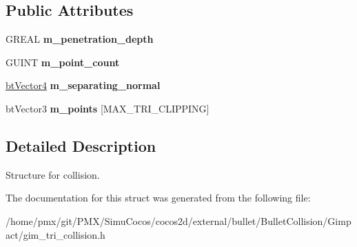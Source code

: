 \subsection*{Public Attributes}
\begin{DoxyCompactItemize}
\item 
\mbox{\label{structGIM__TRIANGLE__CONTACT__DATA_a42268781ae742b60561e8af4297284e1}} 
G\+R\+E\+AL {\bfseries m\+\_\+penetration\+\_\+depth}
\item 
\mbox{\label{structGIM__TRIANGLE__CONTACT__DATA_a60e062bd749b9ce60ad87ae5c577aa49}} 
G\+U\+I\+NT {\bfseries m\+\_\+point\+\_\+count}
\item 
\mbox{\label{structGIM__TRIANGLE__CONTACT__DATA_af060d0dbffcd1be4c3afe488efbd4df5}} 
\hyperlink{classbtVector4}{bt\+Vector4} {\bfseries m\+\_\+separating\+\_\+normal}
\item 
\mbox{\label{structGIM__TRIANGLE__CONTACT__DATA_a45942a990c824d0e61bb6e57aa1ffd10}} 
bt\+Vector3 {\bfseries m\+\_\+points} \mbox{[}M\+A\+X\+\_\+\+T\+R\+I\+\_\+\+C\+L\+I\+P\+P\+I\+NG\mbox{]}
\end{DoxyCompactItemize}


\subsection{Detailed Description}
Structure for collision. 

The documentation for this struct was generated from the following file\+:\begin{DoxyCompactItemize}
\item 
/home/pmx/git/\+P\+M\+X/\+Simu\+Cocos/cocos2d/external/bullet/\+Bullet\+Collision/\+Gimpact/gim\+\_\+tri\+\_\+collision.\+h\end{DoxyCompactItemize}
